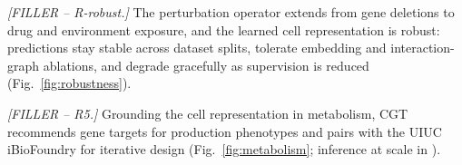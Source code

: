 \textit{[FILLER -- R-robust.]} The perturbation operator extends from gene deletions to drug and
environment exposure, and the learned cell representation is robust: predictions stay stable
across dataset splits, tolerate embedding and interaction-graph ablations, and degrade
gracefully as supervision is reduced (Fig.~\ref{fig:robustness}).

\begin{figure}[t]
\end{figure}
\FloatBarrier

\textit{[FILLER -- R5.]} Grounding the cell representation in metabolism, CGT recommends gene
targets for production phenotypes and pairs with the UIUC iBioFoundry for iterative design
(Fig.~\ref{fig:metabolism}; inference at scale in ).

